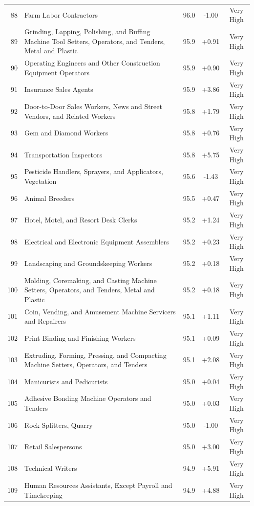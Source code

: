 {\begin{longtable}{rp{7cm}ccc}
88 & Farm Labor Contractors & 96.0 & -1.00 & Very High \\
89 & Grinding, Lapping, Polishing, and Buffing Machine Tool Setters, Operators, and Tenders, Metal and Plastic & 95.9 & +0.91 & Very High \\
90 & Operating Engineers and Other Construction Equipment Operators & 95.9 & +0.90 & Very High \\
91 & Insurance Sales Agents & 95.9 & +3.86 & Very High \\
92 & Door-to-Door Sales Workers, News and Street Vendors, and Related Workers & 95.8 & +1.79 & Very High \\
93 & Gem and Diamond Workers & 95.8 & +0.76 & Very High \\
94 & Transportation Inspectors & 95.8 & +5.75 & Very High \\
95 & Pesticide Handlers, Sprayers, and Applicators, Vegetation & 95.6 & -1.43 & Very High \\
96 & Animal Breeders & 95.5 & +0.47 & Very High \\
97 & Hotel, Motel, and Resort Desk Clerks & 95.2 & +1.24 & Very High \\
98 & Electrical and Electronic Equipment Assemblers & 95.2 & +0.23 & Very High \\
99 & Landscaping and Groundskeeping Workers & 95.2 & +0.18 & Very High \\
100 & Molding, Coremaking, and Casting Machine Setters, Operators, and Tenders, Metal and Plastic & 95.2 & +0.18 & Very High \\
101 & Coin, Vending, and Amusement Machine Servicers and Repairers & 95.1 & +1.11 & Very High \\
102 & Print Binding and Finishing Workers & 95.1 & +0.09 & Very High \\
103 & Extruding, Forming, Pressing, and Compacting Machine Setters, Operators, and Tenders & 95.1 & +2.08 & Very High \\
104 & Manicurists and Pedicurists & 95.0 & +0.04 & Very High \\
105 & Adhesive Bonding Machine Operators and Tenders & 95.0 & +0.03 & Very High \\
106 & Rock Splitters, Quarry & 95.0 & -1.00 & Very High \\
107 & Retail Salespersons & 95.0 & +3.00 & Very High \\
108 & Technical Writers & 94.9 & +5.91 & Very High \\
109 & Human Resources Assistants, Except Payroll and Timekeeping & 94.9 & +4.88 & Very High \\

\end{longtable}}

